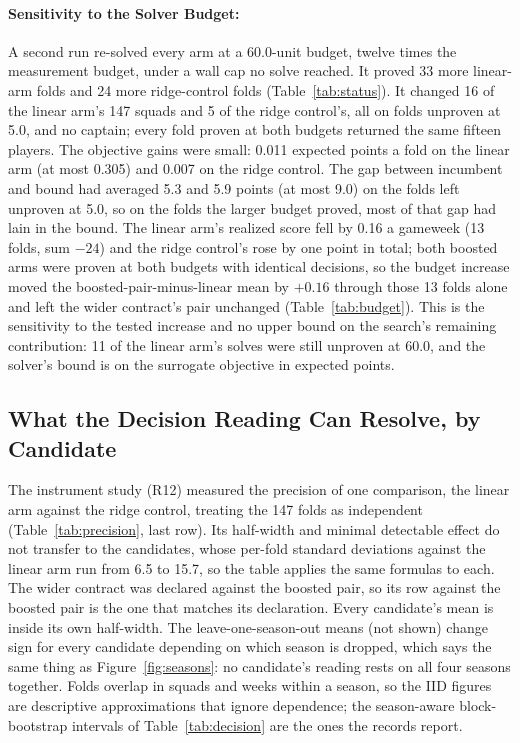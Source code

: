 \documentclass[11pt,a4paper]{article}
\begin{document}
\paragraph{Sensitivity to the Solver Budget:} A second run re-solved every arm at a 60.0-unit budget, twelve times the measurement budget, under a wall cap no solve reached. It proved 33 more linear-arm folds and 24 more ridge-control folds (Table~\ref{tab:status}). It changed 16 of the linear arm's 147 squads and 5 of the ridge control's, all on folds unproven at 5.0, and no captain; every fold proven at both budgets returned the same fifteen players. The objective gains were small: 0.011 expected points a fold on the linear arm (at most 0.305) and 0.007 on the ridge control. The gap between incumbent and bound had averaged 5.3 and 5.9 points (at most 9.0) on the folds left unproven at 5.0, so on the folds the larger budget proved, most of that gap had lain in the bound. The linear arm's realized score fell by 0.16 a gameweek (13 folds, sum $-24$) and the ridge control's rose by one point in total; both boosted arms were proven at both budgets with identical decisions, so the budget increase moved the boosted-pair-minus-linear mean by $+0.16$ through those 13 folds alone and left the wider contract's pair unchanged (Table~\ref{tab:budget}). This is the sensitivity to the tested increase and no upper bound on the search's remaining contribution: 11 of the linear arm's solves were still unproven at 60.0, and the solver's bound is on the surrogate objective in expected points.


\subsection{What the Decision Reading Can Resolve, by Candidate}
\label{sec:precision}

The instrument study (R12) measured the precision of one comparison, the linear arm against the ridge control, treating the 147 folds as independent (Table~\ref{tab:precision}, last row). Its half-width and minimal detectable effect do not transfer to the candidates, whose per-fold standard deviations against the linear arm run from 6.5 to 15.7, so the table applies the same formulas to each. The wider contract was declared against the boosted pair, so its row against the boosted pair is the one that matches its declaration. Every candidate's mean is inside its own half-width. The leave-one-season-out means (not shown) change sign for every candidate depending on which season is dropped, which says the same thing as Figure~\ref{fig:seasons}: no candidate's reading rests on all four seasons together. Folds overlap in squads and weeks within a season, so the IID figures are descriptive approximations that ignore dependence; the season-aware block-bootstrap intervals of Table~\ref{tab:decision} are the ones the records report.
\end{document}

